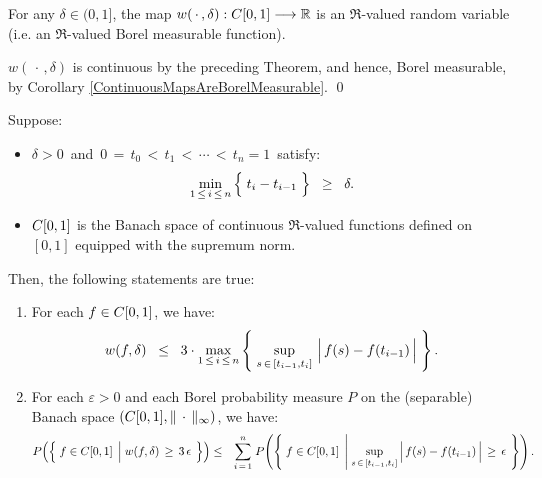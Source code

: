\begin{corollary}
\mbox{}\vskip 0.1cm
\noindent
For any $\delta \in (0,1]$,
the map
$w(\,\cdot\,,\delta) : C[0,1] \longrightarrow \mathbb{R}$
is an $\Re$-valued random variable (i.e. an $\Re$-valued Borel measurable function).
\end{corollary}
\proof
$w(\,\cdot\,,\delta)$ is continuous by the preceding Theorem, and hence,
Borel measurable, by Corollary \ref{ContinuousMapsAreBorelMeasurable}.
\qed

\begin{proposition}
\mbox{}\vskip 0.2cm
\noindent
Suppose:
\begin{itemize}
\item	$\delta > 0$\, and \,$0 \,=\, t_{0} \,<\, t_{1} \,<\, \cdots \,<\, t_{n} = 1$\, satisfy:
		\begin{equation*}
		\min_{1\,\leq\,i\,\leq\,n}\left\{\;\overset{{\color{white}.}}{t}_{i} - t_{i-1}\;\right\}
		\;\; \geq \;\; \delta.
		\end{equation*}
\item	$C[0,1]$ is the Banach space of continuous $\Re$-valued functions defined on $[0,1]$
		equipped with the supremum norm.
\end{itemize}
Then, the following statements are true:
\begin{enumerate}
\item	For each $f \in C[0,1]$, we have:
		\begin{equation*}
		w(f,\delta) \;\; \leq \;\; 3 \cdot
			\max_{1\,\leq\,i\,\leq\,n}\left\{\;
				\sup_{s\,\in\,[t_{i-1},t_{i}]}\,\left\vert\,\overset{{\color{white}.}}{f}(s) - f(t_{i-1})\,\right\vert
			\;\right\}.
		\end{equation*}
\item	For each $\varepsilon > 0$ and each Borel probability measure $P$ on
		the (separable) Banach space $\left(C[0,1],\Vert\,\cdot\,\Vert_{\infty}\right)$,
		we have:
		\begin{eqnarray*}
		P\!\left(\left\{\;f\in\Czo\;\left\vert\;\overset{{\color{white}1}}{w}(f,\delta)\,\geq\,3\,\epsilon\right.\;\right\}\right)
		&\leq& \overset{n}{\underset{i\,=\,1}{\sum}}\;
			P\!\left(\left\{\; f\in\Czo \;\left\vert\;
				\underset{s\,\in\,[t_{i-1},t_{i}]}{\sup}
				\left\vert\,f(s) \overset{{\color{white}.}}{-} f(t_{i-1})\,\right\vert\,\geq\,\epsilon
				\right.\;\right\}\right).
		\end{eqnarray*}
\end{enumerate}
\end{proposition}
